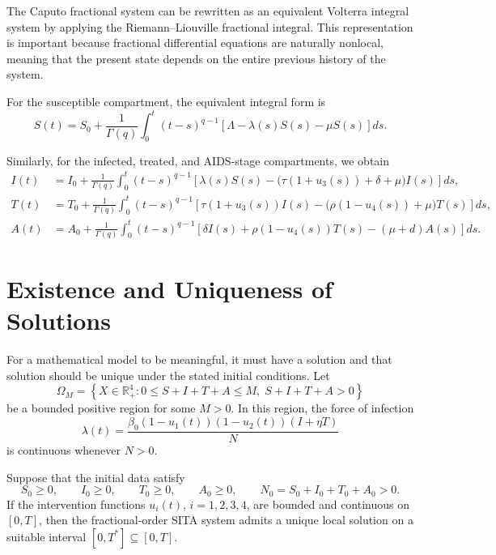 \documentclass[12pt,a4paper,oneside]{report}
\begin{document}
The Caputo fractional system can be rewritten as an equivalent Volterra integral system by applying the Riemann--Liouville fractional integral. This representation is important because fractional differential equations are naturally nonlocal, meaning that the present state depends on the entire previous history of the system.

For the susceptible compartment, the equivalent integral form is
\begin{equation}
S(t)=S_0+\frac{1}{\Gamma(q)}
\int_0^t (t-s)^{q-1}
\left[\Lambda-\lambda(s)S(s)-\mu S(s)\right]ds.
\label{eq:int_S}
\end{equation}

Similarly, for the infected, treated, and AIDS-stage compartments, we obtain
\begin{align}
I(t)&=I_0+\frac{1}{\Gamma(q)}
\int_0^t (t-s)^{q-1}
\left[
\lambda(s)S(s)-\bigl(\tau(1+u_3(s))+\delta+\mu\bigr)I(s)
\right]ds,
\label{eq:int_I}\\[4pt]
T(t)&=T_0+\frac{1}{\Gamma(q)}
\int_0^t (t-s)^{q-1}
\left[
\tau(1+u_3(s))I(s)-\bigl(\rho(1-u_4(s))+\mu\bigr)T(s)
\right]ds,
\label{eq:int_T}\\[4pt]
A(t)&=A_0+\frac{1}{\Gamma(q)}
\int_0^t (t-s)^{q-1}
\left[
\delta I(s)+\rho(1-u_4(s))T(s)-(\mu+d)A(s)
\right]ds.
\label{eq:int_A}
\end{align}

\section{Existence and Uniqueness of Solutions}

For a mathematical model to be meaningful, it must have a solution and that solution should be unique under the stated initial conditions. Let
\[
\Omega_M=\left\{X\in\mathbb{R}_+^4: 0\leq S+I+T+A\leq M,\; S+I+T+A>0\right\}
\]
be a bounded positive region for some $M>0$. In this region, the force of infection
\[
\lambda(t)=\frac{\beta_0(1-u_1(t))(1-u_2(t))(I+\eta T)}{N}
\]
is continuous whenever $N>0$.

\begin{resultbox}[title={Theorem 4.1 --- Existence and Uniqueness}]
Suppose that the initial data satisfy
\[
S_0\geq0,\qquad I_0\geq0,\qquad T_0\geq0,\qquad A_0\geq0,
\qquad N_0=S_0+I_0+T_0+A_0>0.
\]
If the intervention functions $u_i(t)$, $i=1,2,3,4$, are bounded and continuous on $[0,T]$, then the fractional-order SITA system admits a unique local solution on a suitable interval $[0,T^*]\subseteq[0,T]$.
\end{resultbox}
\end{document}
